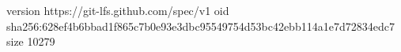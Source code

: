 version https://git-lfs.github.com/spec/v1
oid sha256:628ef4b6bbad1f865c7b0e93e3dbc95549754d53bc42ebb114a1e7d72834edc7
size 10279
